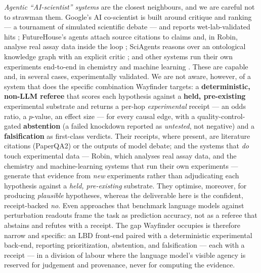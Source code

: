 \emph{Agentic ``AI-scientist'' systems} are the closest neighbours, and we are careful not to strawman them.
Google's AI co-scientist is built around critique and ranking --- a tournament of simulated scientific debate
--- and reports wet-lab-validated hits \cite{gottweis2025}; FutureHouse's agents attach source citations to
claims and, in Robin, analyse real assay data inside the loop \cite{paperqa2024,robin2025}; SciAgents reasons
over an ontological knowledge graph with an explicit critic \cite{sciagents2025}; and other systems run their
own experiments end-to-end in chemistry and machine learning \cite{boiko2023,aiscientist2024}. These are
capable and, in several cases, experimentally validated. We are not aware, however, of a system that does the
specific combination Wayfinder targets: a \textbf{deterministic, non-LLM referee} that scores each hypothesis against a
\textbf{held, pre-existing} experimental substrate and returns a per-hop \emph{experimental} receipt --- an
odds ratio, a $p$-value, an effect size --- for every causal edge, with a quality-control-gated
\textbf{abstention} (a failed knockdown reported as \emph{untested}, not negative) and a \textbf{falsification}
as first-class verdicts. Their receipts, where present, are literature citations (PaperQA2) or the outputs of
model debate; and the systems that \emph{do} touch experimental data --- Robin, which analyses real assay
data, and the chemistry and machine-learning systems that run their own experiments --- generate that
evidence from \emph{new} experiments rather than adjudicating each hypothesis against a \emph{held,
pre-existing} substrate. They optimise, moreover, for producing \emph{plausible} hypotheses, whereas the
deliverable here is the confident, receipt-backed \emph{no}. Even approaches that benchmark language models against perturbation
readouts \cite{perturbqa2025} frame the task as prediction accuracy, not as a referee that abstains and
refutes with a receipt. The gap Wayfinder occupies is therefore narrow and specific: an LBD front-end paired
with a deterministic experimental back-end, reporting prioritization, abstention, and falsification --- each
with a receipt --- in a division of labour where the language model's visible agency is reserved for judgement
and provenance, never for computing the evidence.
